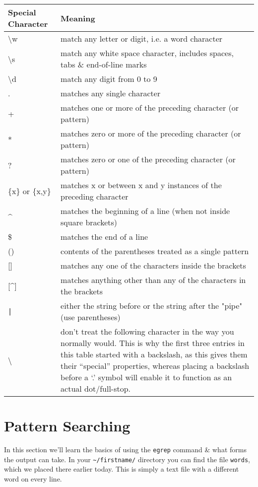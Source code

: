 \begin{center}
\renewcommand{\arraystretch}{1.6}
\begin{tabular}{|p{4cm} | p{} |}
\hline
Special Character & Meaning \\ \hline
\textbackslash w & match any letter or digit, i.e. a word character \\
\textbackslash s & match any white space character, includes spaces,
tabs \& end-of-line marks \\
\textbackslash d & match any digit from 0 to 9 \\
. & matches any single character \\
+ & matches one or more of the preceding character (or pattern) \\
\** & matches zero or more of the preceding character (or pattern) \\
? & matches zero or one of the preceding character (or pattern) \\
\{x\} or \{x,y\} & matches x or between x and y instances of the preceding
character \\
\^{} & matches the beginning of a line (when not inside square brackets) \\
\$ & matches the end of a line \\
() & contents of the parentheses treated as a single pattern \\
{[}] & matches any one of the characters inside the brackets \\
{[}\^{}] & matches anything other than any of the characters in the brackets \\
\texttt{|} & either the string before or the string after the "pipe" (use parentheses) \\
\textbackslash & don't treat the following character in the way you normally would. This is why the first three entries in this table started with a backslash, as this gives them their ``special'' properties, whereas placing a backslash before a `.' symbol will enable it to function as an actual dot/full-stop. \\
\hline
\end{tabular}
\end{center}

\section{Pattern Searching}
In this section we'll learn the basics of using the \texttt{egrep} command \& what forms the output can take.
In your \texttt{\~{}/firstname/} directory you can find the file \texttt{words}, which we placed there earlier today.
This is simply a text file with a different word on every line. \\

